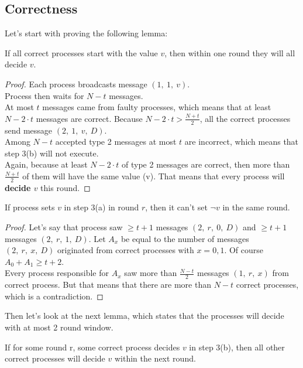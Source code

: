 \documentclass[12pt, a4paper]{article}
\begin{document}
\subsection*{Correctness}
Let's start with proving the following lemma:
\begin{lemma} 
If all correct processes start with the value $v$, then within one round they will all decide $v$.
\end{lemma}
\begin{proof}
Each process broadcasts message $(1,\ 1,\ v)$.\\
Process then waits for $N-t$ messages.\\
At most $t$ messages came from faulty processes, which means that at least $N-2\cdot t$ messages are correct. Because $N-2\cdot t>\frac{N+t}{2}$, all the correct processes send message $(2,\ 1,\ v,\ D)$.\\
Among $N-t$ accepted type 2 messages at most $t$ are incorrect, which means that step 3(b) will not execute.\\
Again, because at least $N-2\cdot t$ of type 2 messages are correct, then more than $\frac{N+t}{2}$ of them will have the same value (v). That means that every process will \textbf{decide $v$} this round.
\end{proof}
\begin{lemma}
If process sets $v$ in step 3(a) in round $r$, then it can't set $\neg v$ in the same round.
\end{lemma}
\begin{proof}
Let's say that process saw $\geq t+1$ messages  $(2,\ r,\ 0,\ D)$ and $\geq t+1$ messages $(2,\ r,\ 1,\ D)$. Let $A_x$ be equal to the number of messages $(2,\ r,\ x,\ D)$ originated from correct processes with $x=0,1$. Of course $A_0+A_1\geq t+2$.\\
Every process responsible for $A_x$ saw more than $\frac{N-t}{2}$ messages $(1,\ r,\ x)$ from correct process. But that means that there are more than $N-t$ correct processes, which is a contradiction.
\end{proof}
Then let's look at the next lemma, which states that the processes will decide with at most 2 round window.
\begin{lemma}
If for some round r, some correct process decides $v$ in step 3(b), then all other correct processes will decide $v$ within the next round.
\end{lemma}
\end{document}
